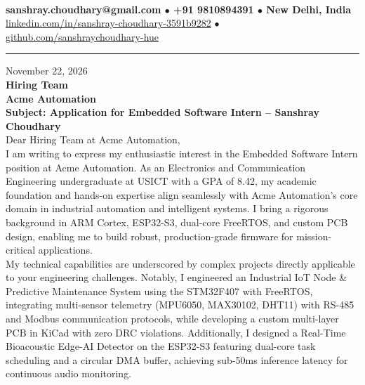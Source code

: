 \documentclass[10pt,a4paper]{article}%
\begin{document}
%
 \vspace{3pt}\\%
\noindent \textbf{\footnotesize sanshray.choudhary@gmail.com $\bullet$ +91 9810894391 $\bullet$ New Delhi, India}\\%
\noindent \href{https://www.linkedin.com/in/sanshray-choudhary-3591b9282}{linkedin.com/in/sanshray-choudhary-3591b9282} $\bullet$ \href{https://github.com/sanshraychoudhary-hue}{github.com/sanshraychoudhary-hue} \vspace{12pt}%
\hrule \vspace{18pt}%

\noindent November 22, 2026 \vspace{12pt}\\%
\noindent \textbf{Hiring Team} \\%
\noindent \textbf{Acme Automation} \vspace{16pt}\\%

\noindent \textbf{Subject: Application for Embedded Software Intern -- Sanshray Choudhary} \vspace{12pt}\\%

\noindent Dear Hiring Team at Acme Automation, \vspace{8pt}\\%

\noindent I am writing to express my enthusiastic interest in the Embedded Software Intern position at Acme Automation. As an Electronics and Communication Engineering undergraduate at USICT with a GPA of 8.42, my academic foundation and hands-on expertise align seamlessly with Acme Automation's core domain in industrial automation and intelligent systems. I bring a rigorous background in ARM Cortex, ESP32-S3, dual-core FreeRTOS, and custom PCB design, enabling me to build robust, production-grade firmware for mission-critical applications. \vspace{8pt}\\

\noindent My technical capabilities are underscored by complex projects directly applicable to your engineering challenges. Notably, I engineered an Industrial IoT Node \& Predictive Maintenance System using the STM32F407 with FreeRTOS, integrating multi-sensor telemetry (MPU6050, MAX30102, DHT11) with RS-485 and Modbus communication protocols, while developing a custom multi-layer PCB in KiCad with zero DRC violations. Additionally, I designed a Real-Time Bioacoustic Edge-AI Detector on the ESP32-S3 featuring dual-core task scheduling and a circular DMA buffer, achieving sub-50ms inference latency for continuous audio monitoring. \vspace{8pt}\\
\end{document}
